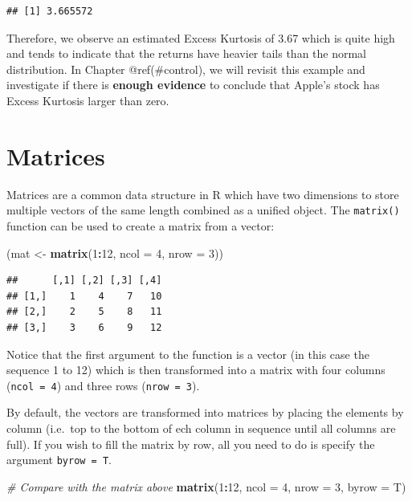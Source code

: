 \documentclass[12pt,]{krantz}
\newenvironment{Shaded}{\begin{snugshade}}{\end{snugshade}}
\newcommand{\KeywordTok}[1]{\textcolor[rgb]{0.27,0.27,0.27}{\textbf{#1}}}
\newcommand{\DataTypeTok}[1]{\textcolor[rgb]{0.27,0.27,0.27}{#1}}
\newcommand{\DecValTok}[1]{\textcolor[rgb]{0.06,0.06,0.06}{#1}}
\newcommand{\StringTok}[1]{\textcolor[rgb]{0.5,0.5,0.5}{#1}}
\newcommand{\CommentTok}[1]{\textcolor[rgb]{0.37,0.37,0.37}{\textit{#1}}}
\newcommand{\OperatorTok}[1]{\textcolor[rgb]{0.43,0.43,0.43}{\textbf{#1}}}
\newcommand{\NormalTok}[1]{#1}
\let\BeginKnitrBlock\begin \let\EndKnitrBlock\end
\begin{document}
\begin{verbatim}
## [1] 3.665572
\end{verbatim}

Therefore, we observe an estimated Excess Kurtosis of 3.67 which is
quite high and tends to indicate that the returns have heavier tails
than the normal distribution. In Chapter @ref(\#control), we will
revisit this example and investigate if there is \textbf{enough
evidence} to conclude that Apple's stock has Excess Kurtosis larger than
zero.

\section{Matrices}\label{matrices}

Matrices are a common data structure in R which have two dimensions to
store multiple vectors of the same length combined as a unified object.
The \texttt{matrix()} function can be used to create a matrix from a
vector:

\begin{Shaded}
\begin{Highlighting}[]
\NormalTok{(mat <-}\StringTok{ }\KeywordTok{matrix}\NormalTok{(}\DecValTok{1}\OperatorTok{:}\DecValTok{12}\NormalTok{, }\DataTypeTok{ncol =} \DecValTok{4}\NormalTok{,  }\DataTypeTok{nrow =} \DecValTok{3}\NormalTok{))}
\end{Highlighting}
\end{Shaded}

\begin{verbatim}
##      [,1] [,2] [,3] [,4]
## [1,]    1    4    7   10
## [2,]    2    5    8   11
## [3,]    3    6    9   12
\end{verbatim}

Notice that the first argument to the function is a vector (in this case
the sequence 1 to 12) which is then transformed into a matrix with four
columns (\texttt{ncol\ =\ 4}) and three rows (\texttt{nrow\ =\ 3}).

\BeginKnitrBlock{rmdtip}
By default, the vectors are transformed into matrices by placing the
elements by column (i.e.~top to the bottom of ech column in sequence
until all columns are full). If you wish to fill the matrix by row, all
you need to do is specify the argument \texttt{byrow\ =\ T}.
\EndKnitrBlock{rmdtip}

\begin{Shaded}
\begin{Highlighting}[]
\CommentTok{# Compare with the matrix above}
\KeywordTok{matrix}\NormalTok{(}\DecValTok{1}\OperatorTok{:}\DecValTok{12}\NormalTok{, }\DataTypeTok{ncol =} \DecValTok{4}\NormalTok{,  }\DataTypeTok{nrow =} \DecValTok{3}\NormalTok{, }\DataTypeTok{byrow =}\NormalTok{ T)}
\end{Highlighting}
\end{Shaded}
\end{document}
